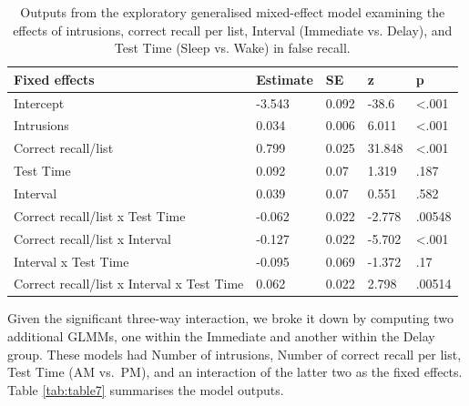 \documentclass[
]{article}
\begin{document}
\begin{table}[H]

\caption{\label{tab:table6}Outputs from the exploratory generalised mixed-effect model examining the effects of intrusions, correct recall per list, Interval (Immediate vs. Delay), and Test Time (Sleep vs. Wake) in false recall.}
\centering
\begin{tabular}[t]{lllll}
\toprule
\textbf{Fixed effects} & \textbf{Estimate} & \textbf{SE} & \textbf{z} & \textbf{p}\\
\midrule
Intercept & -3.543 & 0.092 & -38.6 & <.001\\
Intrusions & 0.034 & 0.006 & 6.011 & <.001\\
Correct recall/list & 0.799 & 0.025 & 31.848 & <.001\\
Test Time & 0.092 & 0.07 & 1.319 & .187\\
Interval & 0.039 & 0.07 & 0.551 & .582\\
\addlinespace
Correct recall/list x Test Time & -0.062 & 0.022 & -2.778 & .00548\\
Correct recall/list x Interval & -0.127 & 0.022 & -5.702 & <.001\\
Interval x Test Time & -0.095 & 0.069 & -1.372 & .17\\
Correct recall/list x Interval x Test Time & 0.062 & 0.022 & 2.798 & .00514\\
\bottomrule
\end{tabular}
\end{table}

Given the significant three-way interaction, we broke it down by computing two additional GLMMs, one within the Immediate and another within the Delay group. These models had Number of intrusions, Number of correct recall per list, Test Time (AM vs.~PM), and an interaction of the latter two as the fixed effects. Table \ref{tab:table7} summarises the model outputs.
\end{document}
